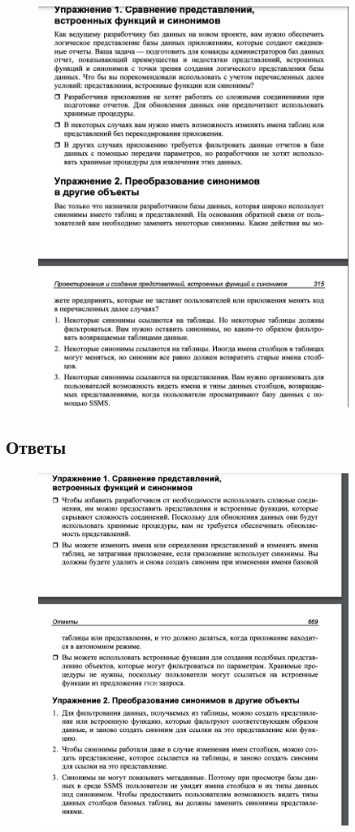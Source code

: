 \begin{figure}[h!]
	\begin{center}
		\includegraphics[width=0.9\textwidth]{img/ex15.png}
	\end{center}
	\captionsetup{justification=centering}
\end{figure}

\subsection*{Ответы}

\begin{figure}[h!]
	\begin{center}
		\includegraphics[width=0.9\textwidth]{img/eans15.png}
	\end{center}
	\captionsetup{justification=centering}
\end{figure}






